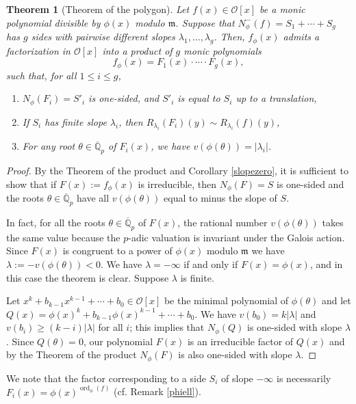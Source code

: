 \documentclass{amsart}
\newtheorem{theorem}{Theorem}[section]
\def\op{\operatorname}
\def\la{\lambda}
\def\m{{\mathfrak m}}
\def\nph#1{N_{\phi}(#1)}
\def\npp#1{N_{\phi}^-(#1)}
\def\oo{{\mathcal O}}
\def\ord{\op{ord}}
\def\qpb{\overline{\mathbb{Q}}_p}
\def\t{\theta}
\def\zpx{\oo[x]}
\begin{document}
\begin{theorem}[Theorem of the polygon] Let $f(x)\in\zpx$ be a monic polynomial divisible by $\phi(x)$ modulo $\m$. Suppose that $\npp{f}=S_1+\cdots+S_g$ has $g$ sides with pairwise different slopes
$\la_1,\dots,\la_g$. Then, $f_{\phi}(x)$ admits a factorization in $\zpx$ into a product of $g$ monic polynomials
$$
f_{\phi}(x)=F_1(x)\cdot\cdots\cdot F_g(x),
$$
such that, for all $1\le i\le g$,
\begin{enumerate}
 \item $\nph{F_i}=S'_i$ is one-sided, and $S'_i$ is equal to $S_i$ up to a translation,
\item If $S_i$ has finite slope $\la_i$, then $R_{\la_i}(F_i)(y)\sim R_{\la_i}(f)(y)$,
\item For any root $\t\in\qpb$ of $F_i(x)$, we have $v(\phi(\t))=|\la_i|$. 
\end{enumerate}
\end{theorem}

\begin{proof}
By  the Theorem of the product and  Corollary \ref{slopezero}, it is sufficient to show that if $F(x):=f_{\phi}(x)$ is irreducible, then  $\nph{F}=S$ is one-sided and the roots $\t\in\qpb$ have all $v(\phi(\t))$ equal to minus the slope of $S$.

In fact, for all the roots $\t\in\qpb$ of $F(x)$, the rational number $v(\phi(\t))$ takes  the same value because the $p$-adic valuation is invariant under the Galois action. Since $F(x)$ is congruent to a power of $\phi(x)$ modulo $\m$ we have $\la:=-v(\phi(\t))<0$. We have $\la=-\infty$ if and only if $F(x)=\phi(x)$, and in this case the theorem is clear. Suppose $\la$ is finite.

Let $x^k+b_{k-1}x^{k-1}+\cdots+b_0\in\zpx$ be the minimal polynomial
of $\phi(\t)$ and let $Q(x)=\phi(x)^k+b_{k-1}\phi(x)^{k-1}+\cdots+b_0$.
We have $v(b_0)=k|\la|$ and $v(b_i)\ge (k-i)|\la|$ for all $i$; this implies that
$\nph{Q}$ is one-sided with slope $\la$. Since $Q(\t)=0$, our
polynomial $F(x)$ is an irreducible factor of $Q(x)$ and by the
Theorem of the product $\nph{F}$ is also one-sided with slope
$\la$.
\end{proof}

We note that the factor corresponding to a side $S_i$ of slope $-\infty$ is necessarily $F_i(x)=\phi(x)^{\ord_{\phi}(f)}$ (cf. Remark \ref{phiell}). 
\end{document}
